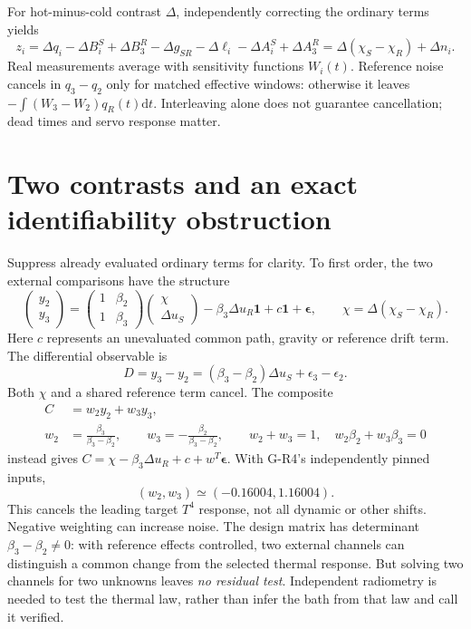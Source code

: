 \documentclass[11pt,a4paper]{article}
\newcommand{\dd}{\mathrm d}
\newcommand{\one}{\mathbf 1}
\begin{document}
For hot-minus-cold contrast $\Delta$, independently correcting the
ordinary terms yields
\begin{equation}\label{eq:residual}
 z_i=\Delta q_i-\Delta B_i^S+\Delta B_3^R
       -\Delta g_{SR}-\Delta\ell_i-\Delta A_i^S+\Delta A_3^R
     =\Delta(\chi_S-\chi_R)+\Delta n_i .
\end{equation}
Real measurements average with sensitivity functions $W_i(t)$.
Reference noise cancels in $q_3-q_2$ only for matched effective windows:
otherwise it leaves $-\int(W_3-W_2)q_R(t)\dd t$. Interleaving alone
does not guarantee cancellation; dead times and servo response matter.

\newpage
\section{Two contrasts and an exact identifiability obstruction}
Suppress already evaluated ordinary terms for clarity. To first order,
the two external comparisons have the structure
\begin{equation}\label{eq:design}
 \begin{pmatrix}y_2\\y_3\end{pmatrix}
 =\begin{pmatrix}1&\beta_2\\1&\beta_3\end{pmatrix}
   \begin{pmatrix}\chi\\\Delta u_S\end{pmatrix}
   -\beta_3\Delta u_R\one+c\one+\boldsymbol\epsilon,
 \qquad \chi=\Delta(\chi_S-\chi_R).
\end{equation}
Here $c$ represents an unevaluated common path, gravity or reference
drift term. The differential observable is
\begin{equation}
 D=y_3-y_2=(\beta_3-\beta_2)\Delta u_S+\epsilon_3-\epsilon_2.
\end{equation}
Both $\chi$ and a shared reference term cancel. The composite
\begin{align}
 C&=w_2y_2+w_3y_3,\\
 w_2&=\frac{\beta_3}{\beta_3-\beta_2},\qquad
 w_3=-\frac{\beta_2}{\beta_3-\beta_2},\qquad
 w_2+w_3=1,\quad w_2\beta_2+w_3\beta_3=0
\end{align}
instead gives $C=\chi-\beta_3\Delta u_R+c+w^T\boldsymbol\epsilon$.
With G-R4's independently pinned inputs,
\begin{equation}
 (w_2,w_3)\simeq(-0.16004,1.16004).
\end{equation}
This cancels the leading target $T^4$ response, not all dynamic or
other shifts. Negative weighting can increase noise. The design matrix
has determinant $\beta_3-\beta_2\ne0$: with reference effects controlled,
two external channels can distinguish a common change from the selected
thermal response. But solving two channels for two unknowns leaves
\emph{no residual test}. Independent radiometry is needed to test the
thermal law, rather than infer the bath from that law and call it verified.
\end{document}
